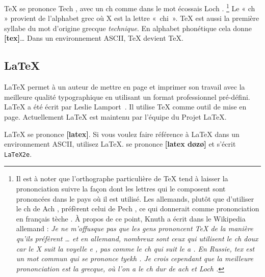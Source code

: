 \TeX{} se prononce \og Tech \fg{}, avec un \og ch \fg{} comme dans le mot
écossais \og Loch \fg{}.
\footnote{Il est à noter que l'orthographe particulière de \TeX{}
  tend à laisser la prononciation suivre la façon dont les lettres qui
  le composent sont prononcées dans le pays où il est utilisé. Les
  allemands, plutôt que d'utiliser le \og ch \fg{} de \og Ach \fg{},
  préfèrent celui de \og Pech \fg{}, ce qui donnerait comme
  prononciation en français \og tèche \fg{}. À propos de ce point,
  Knuth a écrit dans le Wikipedia allemand : \emph{Je ne m'offusque
    pas que les gens prononcent \TeX{} de la manière qu'ils préfèrent
    \ldots{} et en allemand, nombreux sont ceux qui utilisent le \og
    ch \fg{} doux car le X suit la voyelle \og e \fg{}, pas comme le
    \og ch \fg{} qui suit le \og a \fg{}. En Russie, \og tex \fg{} est
    un mot commun qui se prononce \og tyekh \fg{}. Je crois cependant
    que la meilleure prononciation est la grecque, où l'on a le \og ch
    \fg{} dur de \og ach \fg{} et \og Loch \fg{}.}}
Le « ch » provient de l'alphabet grec où X est la lettre « chi ». \TeX{} est aussi la
première syllabe du mot d'origine grecque \emph{technique}.
En alphabet phonétique cela donne
\textbf{[tex]}\dots{} Dans un environnement ASCII, \TeX{}
devient TeX.

\subsection{\LaTeX}

\LaTeX{} permet à un auteur de mettre en page et imprimer son travail
avec la meilleure qualité typographique en utilisant un format
professionnel pré-défini. \LaTeX{} a été écrit par Leslie Lamport~\cite{manual}. Il utilise \TeX{} comme outil
de mise en page. Actuellement \LaTeX{} est maintenu par
l'équipe du Projet \LaTeX{}.


\LaTeX{} se prononce \textbf{[latex]}. Si vous
voulez faire référence à \LaTeX{} dans un environnement
ASCII, utilisez LaTeX. \LaTeXe{} se prononce
\textbf{[latex d\o{}z\o{}]} et s'écrit
\texttt{LaTeX2e}.

